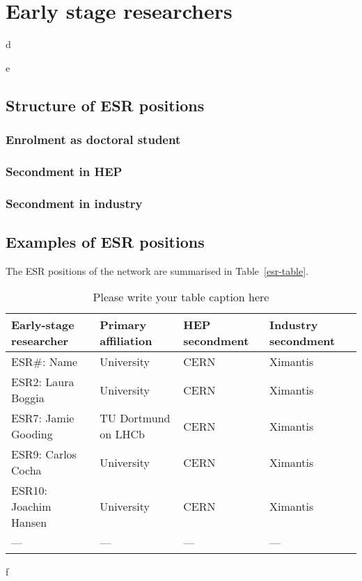 \section{Early stage researchers}
\label{esrs}
d\par
e

\subsection{Structure of ESR positions}
\label{esr-structure}

\subsubsection{Enrolment as doctoral student}
\label{esr-enrolment}

\subsubsection{Secondment in HEP}
\label{esr-hep}

\subsubsection{Secondment in industry}
\label{esr-industry}


\subsection{Examples of ESR positions}
\label{esr-examples}
The ESR positions of the network are summarised in Table~\ref{esr-table}.

\begin{table}
    \centering
    \caption{Please write your table caption here}
    \label{tab-1}       
    \begin{tabular}{llll}
    \hline
    Early-stage researcher & Primary affiliation & HEP secondment & Industry secondment \\\hline
    ESR\#: Name & University & CERN & Ximantis \\
    ESR2: Laura Boggia & University & CERN & Ximantis \\
    ESR7: Jamie Gooding & TU Dortmund on LHCb & CERN & Ximantis \\
    ESR9: Carlos Cocha & University & CERN & Ximantis \\
    ESR10: Joachim Hansen & University & CERN & Ximantis \\
    --- & --- & --- & --- \\\hline
    \end{tabular}
\end{table}

f